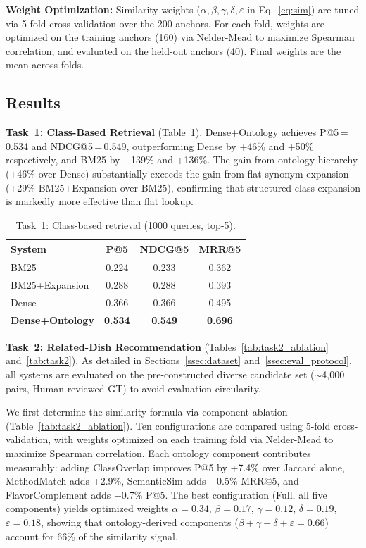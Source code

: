 \textbf{Weight Optimization:} 
Similarity weights ($\alpha, \beta, \gamma, \delta, \varepsilon$ in Eq.~\ref{eq:sim}) are tuned via 5-fold cross-validation over the 200 anchors. For each fold, weights are optimized on the training anchors (160) via Nelder-Mead to maximize Spearman correlation, and evaluated on the held-out anchors (40). Final weights are the mean across folds.

\subsection{Results}

\textbf{Task~1: Class-Based Retrieval} (Table~\ref{tab:task1}).
Dense+Ontology achieves P@5\,=\,0.534 and NDCG@5\,=\,0.549, outperforming Dense by +46\% and +50\% respectively, and BM25 by +139\% and +136\%. The gain from ontology hierarchy (+46\% over Dense) substantially exceeds the gain from flat synonym expansion (+29\% BM25+Expansion over BM25), confirming that structured class expansion is markedly more effective than flat lookup.

\begin{table}[t]
\centering
\caption{Task~1: Class-based retrieval (1000 queries, top-5).}
\label{tab:task1}
\small
\begin{tabular}{lccc}
\toprule
\textbf{System} & \textbf{P@5} & \textbf{NDCG@5} & \textbf{MRR@5} \\
\midrule
BM25                    & 0.224 & 0.233 & 0.362 \\
BM25+Expansion          & 0.288 & 0.288 & 0.393 \\
Dense                   & 0.366 & 0.366 & 0.495 \\
\textbf{Dense+Ontology} & \textbf{0.534} & \textbf{0.549} & \textbf{0.696} \\
\bottomrule
\end{tabular}
\end{table}

\textbf{Task~2: Related-Dish Recommendation} (Tables~\ref{tab:task2_ablation} and~\ref{tab:task2}).
As detailed in Sections~\ref{ssec:dataset} and~\ref{ssec:eval_protocol}, all systems are evaluated on the pre-constructed diverse candidate set (${\sim}$4{,}000 pairs, Human-reviewed GT) to avoid evaluation circularity. 

We first determine the similarity formula via component ablation (Table~\ref{tab:task2_ablation}). Ten configurations are compared using 5-fold cross-validation, with weights optimized on each training fold via Nelder-Mead to maximize Spearman correlation. Each ontology component contributes measurably: adding ClassOverlap improves P@5 by +7.4\% over Jaccard alone, MethodMatch adds +2.9\%, SemanticSim adds +0.5\% MRR@5, and FlavorComplement adds +0.7\% P@5. The best configuration (Full, all five components) yields optimized weights $\alpha = 0.34$, $\beta = 0.17$, $\gamma = 0.12$, $\delta = 0.19$, $\varepsilon = 0.18$, showing that ontology-derived components ($\beta + \gamma + \delta + \varepsilon = 0.66$) account for 66\% of the similarity signal.

